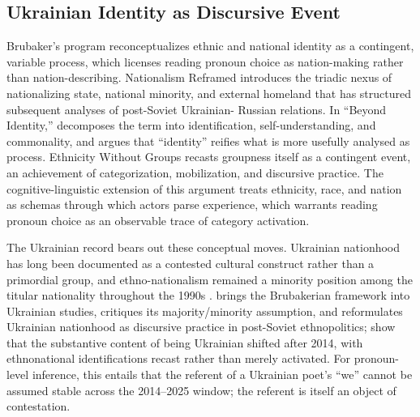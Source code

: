 \documentclass[12pt]{interact}
\theoremstyle{plain}%
\theoremstyle{definition}
\theoremstyle{remark}
\begin{document}
\subsection{Ukrainian Identity as Discursive Event}

Brubaker's program reconceptualizes ethnic and national identity as a contingent, variable process, which licenses reading pronoun choice as nation-making rather than nation-describing. Nationalism Reframed \citep{brubaker1996nationalism} introduces the triadic nexus of nationalizing state, national minority, and external homeland that has structured subsequent analyses of post-Soviet Ukrainian- Russian relations. In ``Beyond Identity,'' \citet{brubaker2000beyond} decomposes the term into identification, self-understanding, and commonality, and argues that ``identity'' reifies what is more usefully analysed as process. Ethnicity Without Groups \citep{brubaker2004ethnicity} recasts groupness itself as a contingent event, an achievement of categorization, mobilization, and discursive practice. The cognitive-linguistic extension of this argument \citep{brubaker2004ethnicity1} treats ethnicity, race, and nation as schemas through which actors parse experience, which warrants reading pronoun choice as an observable trace of category activation.

The Ukrainian record bears out these conceptual moves. Ukrainian nationhood has long been documented as a contested cultural construct rather than a primordial group, and ethno-nationalism remained a minority position among the titular nationality throughout the 1990s \citep{wilson1997ukrainian, wilson2000the}. \citet{kulyk2001the} brings the Brubakerian framework into Ukrainian studies, critiques its majority/minority assumption, and reformulates Ukrainian nationhood as discursive practice in post-Soviet ethnopolitics; \citet{kulyk2016national, kulyk2018shedding} show that the substantive content of being Ukrainian shifted after 2014, with ethnonational identifications recast rather than merely activated. For pronoun-level inference, this entails that the referent of a Ukrainian poet's ``we'' cannot be assumed stable across the 2014--2025 window; the referent is itself an object of contestation.
\end{document}
